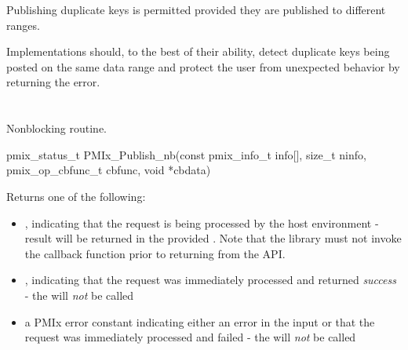 \adviceuserstart
Publishing duplicate keys is permitted provided they are published to different ranges.
\adviceuserend

\adviceimplstart
Implementations should, to the best of their ability, detect duplicate keys being posted on the same data range and protect the
user from unexpected behavior by returning the  error.
\adviceimplend

\section{}

\summary

Nonblocking  routine.

\format

\cspecificstart
\begin{codepar}
pmix_status_t
PMIx_Publish_nb(const pmix_info_t info[], size_t ninfo,
                pmix_op_cbfunc_t cbfunc, void *cbdata)
\end{codepar}
\cspecificend

\begin{arglist}
\end{arglist}

Returns one of the following:

\begin{itemize}
    \item {}, indicating that the request is being processed by the host environment - result will be returned in the provided . Note that the library must not invoke the callback function prior to returning from the \ac{API}.
    \item {}, indicating that the request was immediately processed and returned \textit{success} - the  will \textit{not} be called
    \item a PMIx error constant indicating either an error in the input or that the request was immediately processed and failed - the  will \textit{not} be called
\end{itemize}

